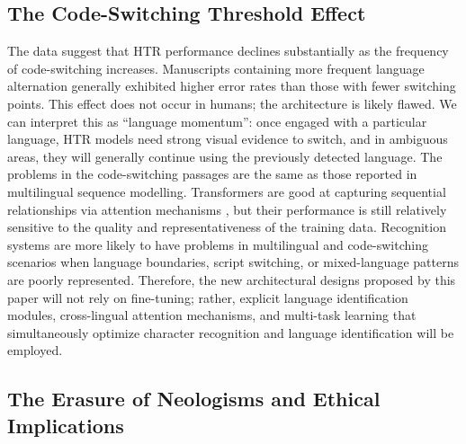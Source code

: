 \documentclass[final]{anthology-ch} %
\begin{document}
\subsection{The Code-Switching Threshold Effect}

The data suggest that HTR performance declines substantially as the frequency of code-switching increases. Manuscripts containing more frequent language alternation generally exhibited higher error rates than those with fewer switching points. This effect does not occur in humans; the architecture is likely flawed. We can interpret this as \enquote{language momentum}: once engaged with a particular language, HTR models need strong visual evidence to switch, and in ambiguous areas, they will generally continue using the previously detected language. The problems in the code-switching passages are the same as those reported in multilingual sequence modelling. Transformers are good at capturing sequential relationships via attention mechanisms \cite{vaswani2017attention}, but their performance is still relatively sensitive to the quality and representativeness of the training data. Recognition systems are more likely to have problems in multilingual and code-switching scenarios when language boundaries, script switching, or mixed-language patterns are poorly represented. Therefore, the new architectural designs proposed by this paper will not rely on fine-tuning; rather, explicit language identification modules, cross-lingual attention mechanisms, and multi-task learning that simultaneously optimize character recognition and language identification will be employed.

\subsection{The Erasure of Neologisms and Ethical Implications}
\end{document}
